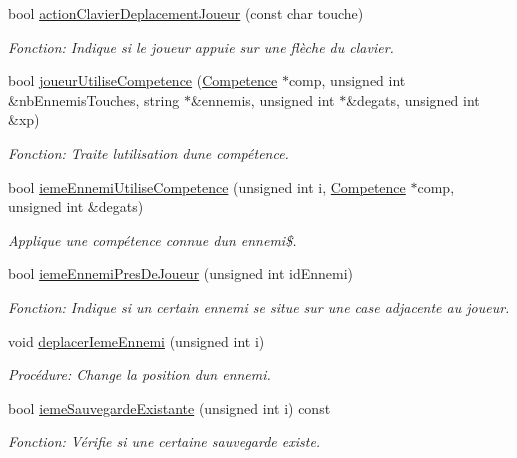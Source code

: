 \begin{DoxyCompactItemize}
bool \mbox{\hyperlink{classJeu_a9aee681503308eea33750298585ad17c}{action\+Clavier\+Deplacement\+Joueur}} (const char touche)
\begin{DoxyCompactList}\small\item\em Fonction\+: Indique si le joueur appuie sur une flèche du clavier. \end{DoxyCompactList}\item 
bool \mbox{\hyperlink{classJeu_a9844f25bb777e1897f574347548258a3}{joueur\+Utilise\+Competence}} (\mbox{\hyperlink{structCompetence}{Competence}} $\ast$comp, unsigned int \&nb\+Ennemis\+Touches, string $\ast$\&ennemis, unsigned int $\ast$\&degats, unsigned int \&xp)
\begin{DoxyCompactList}\small\item\em Fonction\+: Traite l\textquotesingle{}utilisation d\textquotesingle{}une compétence. \end{DoxyCompactList}\item 
bool \mbox{\hyperlink{classJeu_a9c40989524484aad81e3fa4e8673b45a}{ieme\+Ennemi\+Utilise\+Competence}} (unsigned int i, \mbox{\hyperlink{structCompetence}{Competence}} $\ast$comp, unsigned int \&degats)
\begin{DoxyCompactList}\small\item\em Applique une compétence connue d\textquotesingle{}un ennemi\$. \end{DoxyCompactList}\item 
bool \mbox{\hyperlink{classJeu_a3e6c39f607eed6ee70c96823e0d41415}{ieme\+Ennemi\+Pres\+De\+Joueur}} (unsigned int id\+Ennemi)
\begin{DoxyCompactList}\small\item\em Fonction\+: Indique si un certain ennemi se situe sur une case adjacente au joueur. \end{DoxyCompactList}\item 
void \mbox{\hyperlink{classJeu_a5638afe1c5fce321b8819461e6e15299}{deplacer\+Ieme\+Ennemi}} (unsigned int i)
\begin{DoxyCompactList}\small\item\em Procédure\+: Change la position d\textquotesingle{}un ennemi. \end{DoxyCompactList}\item 
bool \mbox{\hyperlink{classJeu_ae477b39ff28b2e999ea6ceb520be6e27}{ieme\+Sauvegarde\+Existante}} (unsigned int i) const
\begin{DoxyCompactList}\small\item\em Fonction\+: Vérifie si une certaine sauvegarde existe. \end{DoxyCompactList}\item 

\end{DoxyCompactItemize}

